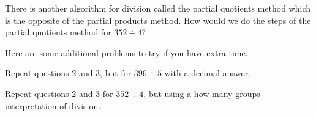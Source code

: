 \documentclass[nooutcomes,noauthor]{ximera}
\begin{document}
\begin{problem}
There is another algorithm for division called the partial quotients method which is the opposite of the partial products method. How would we do the steps of the partial quotients method for $352 \div 4$?
\end{problem}

\newpage

Here are some additional problems to try if you have extra time.


\begin{problem}
Repeat questions 2 and 3, but for $396 \div 5$ with a decimal answer.
\end{problem}


\begin{problem}
Repeat questions 2 and 3 for $352 \div 4$, but using a how many groups interpretation of division.
\end{problem}




\newpage
\end{document}

